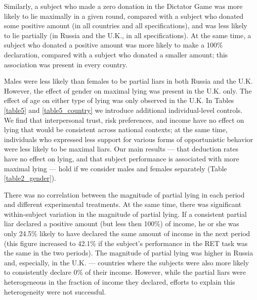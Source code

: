 \documentclass[12pt]{article}
\begin{document}
\par Similarly, a subject who made a zero donation in the Dictator Game was more likely to lie maximally in a given round, compared with a subject who donated some positive amount (in all countries and all specifications), and was less likely to lie partially (in Russia and the U.K., in all specifications). At the same time, a subject who donated a positive amount was more likely to make a 100\% declaration, compared with a subject who donated a smaller amount; this association was present in every country. 

\par Males were less likely than females to be partial liars in both Russia and the U.K. However, the effect of gender on maximal lying was present in the U.K. only. The effect of age on either type of lying was only observed in the U.K. In Tables \ref{table5} and \ref{table5_country} we introduce additional individual-level controls. We find that interpersonal trust, risk preferences, and income have no effect on lying that would be consistent across national contexts; at the same time, individuals who expressed less support for various forms of opportunistic behavior were less likely to be maximal liars.\footnotemark{}
 Our main results --- that deduction rates have no effect on lying, and that subject performance is associated with more maximal lying --- hold if we consider males and females separately (Table \ref{table2_gender}). 

\par There was no correlation between the magnitude of partial lying in each period and different experimental treatments. At the same time, there was significant within-subject variation in the magnitude of partial lying. If a consistent partial liar declared a positive amount (but less then 100\%) of income, he or she was only 24.5\% likely to have declared the same amount of income in the next period (this figure increased to 42.1\% if the subject's performance in the RET task was the same in the two periods). The magnitude of partial lying was higher in Russia and, especially, in the U.K. --- countries where the subjects were also more likely to consistently declare 0\% of their income. However, while the partial liars were heterogeneous in the fraction of income they declared, efforts to explain this heterogeneity were not successful.\footnotemark{}
\end{document}
